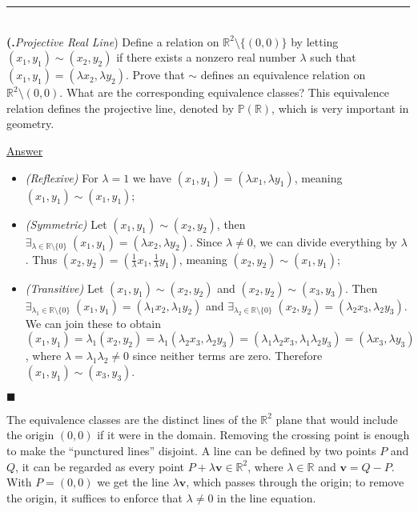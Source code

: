 \documentclass{article}[10pt]
\newenvironment{exercise}[1]
    {\noindent\rule{2cm}{0.4pt} \\
     \textbf{#1.}}
    {}
\newcommand{\answer}{

  \underline{Answer}

}
\newcommand{\qed}{

\hfill\ensuremath{\blacksquare}

}
\begin{document}
\begin{exercise}{29}
  (\emph{Projective Real Line})
  Define a relation on $\mathds{R}^2 \setminus \{(0, 0)\}$
  by letting $(x_1, y_1) \sim (x_2, y_2)$
  if there exists a nonzero real number $\lambda$
  such that $(x_1, y_1) = (\lambda x_2, \lambda y_2)$.
  Prove that $\sim$ defines an equivalence relation
  on $\mathds{R}^2 \setminus (0, 0)$.
  What are the corresponding equivalence classes?
  This equivalence relation defines the projective line,
  denoted by $\mathds{P}(\mathds{R})$,
  which is very important in geometry.
  \answer
  \begin{itemize}
    \item \emph{(Reflexive)}
      For $\lambda = 1$
      we have $(x_1, y_1) = (\lambda x_1, \lambda y_1)$,
      meaning $(x_1, y_1) \sim (x_1, y_1)$;
    \item \emph{(Symmetric)}
      Let $(x_1, y_1) \sim (x_2, y_2)$,
      then $\exists_{\lambda \in \mathds{R} \setminus \{0\}} \;
            (x_1, y_1) = (\lambda x_2, \lambda y_2)$.
      Since $\lambda \ne 0$, we can divide everything by $\lambda$.
      Thus $(x_2, y_2) = \left( \frac{1}{\lambda} x_1,
                                \frac{1}{\lambda} y_1 \right)$,
      meaning $(x_2, y_2) \sim (x_1, y_1)$;
    \item \emph{(Transitive)}
      Let $(x_1, y_1) \sim (x_2, y_2)$
      and $(x_2, y_2) \sim (x_3, y_3)$.
      Then $\exists_{\lambda_1 \in \mathds{R} \setminus \{0\}} \;
            (x_1, y_1) = (\lambda_1 x_2, \lambda_1 y_2)$
      and $\exists_{\lambda_2 \in \mathds{R} \setminus \{0\}} \;
           (x_2, y_2) = (\lambda_2 x_3, \lambda_2 y_3)$.
      We can join these to obtain
      $
        (x_1, y_1) = \lambda_1 (x_2, y_2)
                   = \lambda_1 (\lambda_2 x_3, \lambda_2 y_3)
                   = (\lambda_1 \lambda_2 x_3, \lambda_1 \lambda_2 y_3)
                   = (\lambda x_3, \lambda y_3)
      $,
      where $\lambda = \lambda_1 \lambda_2 \ne 0$
      since neither terms are zero.
      Therefore $(x_1, y_1) \sim (x_3, y_3)$.
  \end{itemize}
  \qed
  The equivalence classes are the distinct lines
  of the $\mathds{R}^2$ plane
  that would include the origin $(0, 0)$
  if it were in the domain.
  Removing the crossing point is enough
  to make the ``punctured lines'' disjoint.
  A line can be defined by two points $P$ and $Q$,
  it can be regarded as every point
  $P + \lambda \mathbf{v} \in \mathds{R}^2$,
  where $\lambda \in \mathds{R}$
  and $\mathbf{v} = Q - P$.
  With $P = (0, 0)$ we get the line $\lambda \mathbf{v}$,
  which passes through the origin;
  to remove the origin, it suffices to enforce that $\lambda \ne 0$
  in the line equation.


\end{exercise}
\end{document}
